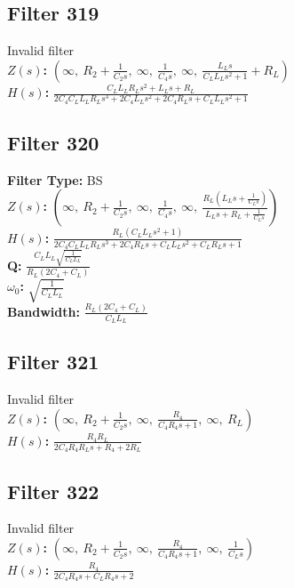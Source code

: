 \documentclass{article}
\begin{document}
\subsection*{Filter 319}
Invalid filter \\ 
\textbf{$Z(s)$:} $\left( \infty, \  R_{2} + \frac{1}{C_{2} s}, \  \infty, \  \frac{1}{C_{4} s}, \  \infty, \  \frac{L_{L} s}{C_{L} L_{L} s^{2} + 1} + R_{L}\right)$ \\ 
\textbf{$H(s)$:} $\frac{C_{L} L_{L} R_{L} s^{2} + L_{L} s + R_{L}}{2 C_{4} C_{L} L_{L} R_{L} s^{3} + 2 C_{4} L_{L} s^{2} + 2 C_{4} R_{L} s + C_{L} L_{L} s^{2} + 1}$ \\ 
\subsection*{Filter 320}
\textbf{Filter Type:} BS \\ 
\textbf{$Z(s)$:} $\left( \infty, \  R_{2} + \frac{1}{C_{2} s}, \  \infty, \  \frac{1}{C_{4} s}, \  \infty, \  \frac{R_{L} \left(L_{L} s + \frac{1}{C_{L} s}\right)}{L_{L} s + R_{L} + \frac{1}{C_{L} s}}\right)$ \\ 
\textbf{$H(s)$:} $\frac{R_{L} \left(C_{L} L_{L} s^{2} + 1\right)}{2 C_{4} C_{L} L_{L} R_{L} s^{3} + 2 C_{4} R_{L} s + C_{L} L_{L} s^{2} + C_{L} R_{L} s + 1}$ \\ 
\textbf{Q:} $\frac{C_{L} L_{L} \sqrt{\frac{1}{C_{L} L_{L}}}}{R_{L} \left(2 C_{4} + C_{L}\right)}$ \\ 
\textbf{$\omega_0$:} $\sqrt{\frac{1}{C_{L} L_{L}}}$ \\ 
\textbf{Bandwidth:} $\frac{R_{L} \left(2 C_{4} + C_{L}\right)}{C_{L} L_{L}}$ \\ 
\subsection*{Filter 321}
Invalid filter \\ 
\textbf{$Z(s)$:} $\left( \infty, \  R_{2} + \frac{1}{C_{2} s}, \  \infty, \  \frac{R_{4}}{C_{4} R_{4} s + 1}, \  \infty, \  R_{L}\right)$ \\ 
\textbf{$H(s)$:} $\frac{R_{4} R_{L}}{2 C_{4} R_{4} R_{L} s + R_{4} + 2 R_{L}}$ \\ 
\subsection*{Filter 322}
Invalid filter \\ 
\textbf{$Z(s)$:} $\left( \infty, \  R_{2} + \frac{1}{C_{2} s}, \  \infty, \  \frac{R_{4}}{C_{4} R_{4} s + 1}, \  \infty, \  \frac{1}{C_{L} s}\right)$ \\ 
\textbf{$H(s)$:} $\frac{R_{4}}{2 C_{4} R_{4} s + C_{L} R_{4} s + 2}$ \\ 
\end{document}
